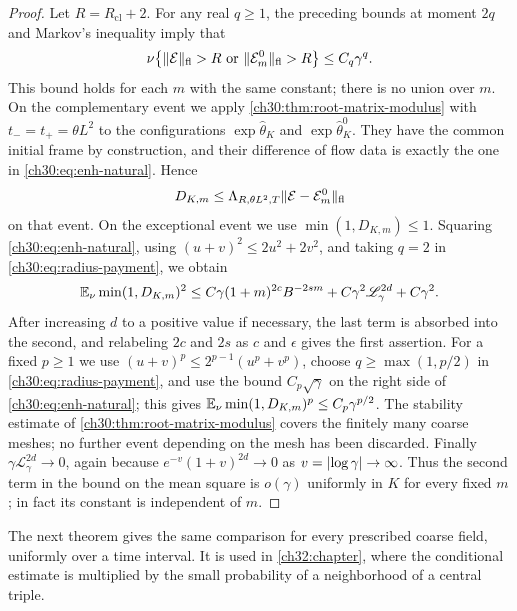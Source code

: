 \begin{proof}
Let $R=R_{\mathrm{cl}}+2$. For any real $q\ge1$, the preceding bounds at moment $2q$ and Markov's inequality imply that
\begin{equation}\label{ch30:eq:radius-payment}
 \nu\bigl\{\lVert \mathcal E\rVert_{\mathrm{fl}}>R\text{ or }\lVert \mathcal E_m^0\rVert_{\mathrm{fl}}>R\bigr\}\le C_q\gamma^q .
\end{equation}
This bound holds for each $m$ with the same constant; there is no union over $m$. On the complementary event we apply \cref{ch30:thm:root-matrix-modulus} with $t_-=t_+=\theta L^2$ to the configurations $\exp\widehat\theta_K$ and $\exp\widehat\theta_K^0$. They have the common initial frame by construction, and their difference of flow data is exactly the one in \eqref{ch30:eq:enh-natural}. Hence
\[
 D_{K,m}\le\Lambda_{R,\theta L^2,T}\lVert \mathcal E-\mathcal E_m^0\rVert_{\mathrm{fl}}
\]
on that event. On the exceptional event we use $\min(1,D_{K,m})\le1$. Squaring \eqref{ch30:eq:enh-natural}, using $(u+v)^2\le2u^2+2v^2$, and taking $q=2$ in \eqref{ch30:eq:radius-payment}, we obtain
\[
 \mathbb E_\nu\min(1,D_{K,m})^2\le C\gamma(1+m)^{2c}B^{-2sm}+C\gamma^2\mathscr L_\gamma^{2d}+C\gamma^2 .
\]
After increasing $d$ to a positive value if necessary, the last term is absorbed into the second, and relabeling $2c$ and $2s$ as $c$ and $\epsilon$ gives the first assertion. For a fixed $p\ge1$ we use $(u+v)^p\le2^{p-1}(u^p+v^p)$, choose $q\ge\max(1,p/2)$ in \eqref{ch30:eq:radius-payment}, and use the bound $C_p\sqrt\gamma$ on the right side of \eqref{ch30:eq:enh-natural}; this gives $\mathbb E_\nu\min(1,D_{K,m})^p\le C_p\gamma^{p/2}$. The stability estimate of \cref{ch30:thm:root-matrix-modulus} covers the finitely many coarse meshes; no further event depending on the mesh has been discarded. Finally $\gamma\mathscr L_\gamma^{2d}\to0$, again because $e^{-v}(1+v)^{2d}\to0$ as $v=\lvert \log\gamma\rvert\to\infty$. Thus the second term in the bound on the mean square is $o(\gamma)$ uniformly in $K$ for every fixed $m$; in fact its constant is independent of $m$.
\end{proof}

The next theorem gives the same comparison for every prescribed coarse field, uniformly over a time interval. It is used in \cref{ch32:chapter}, where the conditional estimate is multiplied by the small probability of a neighborhood of a central triple.

